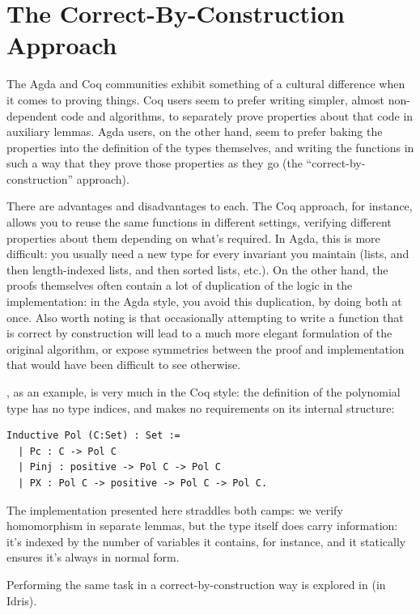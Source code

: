 \documentclass[draft, twocolumn]{article}
\theoremstyle{definition}
\theoremstyle{definition}
\begin{document}
\section{The Correct-By-Construction Approach}
The Agda and Coq communities exhibit something of a cultural difference when it
comes to proving things. Coq users seem to prefer writing simpler, almost
non-dependent code and algorithms, to separately prove properties about that
code in auxiliary lemmas. Agda users, on the other hand, seem to prefer baking
the properties into the definition of the types themselves, and writing the
functions in such a way that they prove those properties as they go (the
``correct-by-construction'' approach).

There are advantages and disadvantages to each. The Coq approach, for instance,
allows you to reuse the same functions in different settings, verifying
different properties about them depending on what's required. In Agda, this is
more difficult: you usually need a new type for every invariant you maintain
(lists, and then length-indexed lists, and then sorted lists, etc.). On the
other hand, the proofs themselves often contain a lot of duplication of the
logic in the implementation: in the Agda style, you avoid this duplication, by
doing both at once. Also worth noting is that occasionally attempting to write a
function that is correct by construction will lead to a much more elegant
formulation of the original algorithm, or expose symmetries between the proof
and implementation that would have been difficult to see otherwise.

\cite{gregoire_proving_2005}, as an example, is very much in the Coq style: the
definition of the polynomial type has no type indices, and makes no requirements
on its internal structure:
\begin{small}
\begin{verbatim}
Inductive Pol (C:Set) : Set :=
  | Pc : C -> Pol C
  | Pinj : positive -> Pol C -> Pol C
  | PX : Pol C -> positive -> Pol C -> Pol C.
\end{verbatim}
\end{small}

The implementation presented here straddles both camps: we verify homomorphism
in separate lemmas, but the type itself does carry information: it's indexed by
the number of variables it contains, for instance, and it statically ensures
it's always in normal form.

Performing the same task in a correct-by-construction way is explored
in\cite{geuvers_automatically_2017} (in Idris\cite{brady_idris_2013}).
\end{document}
